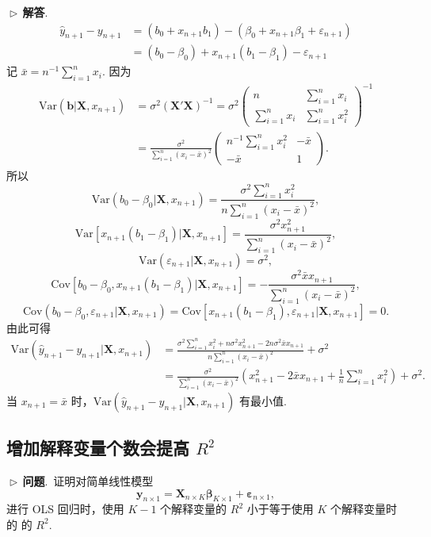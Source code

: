 \documentclass{article}
\newcommand{\Var}{\mathrm{Var}}
\newcommand{\Cov}{\mathrm{Cov}}
\newcommand{\y}{\mathbf{y}}
\newcommand{\X}{\mathbf{X}}
\newcommand{\0}{\mathbf{0}}
\newcommand{\vbe}{\bm{\beta}}
\newcommand{\vep}{\bm{\varepsilon}}
\newcommand{\vb}{\mathbf{b}}
\newcommand{\pro}{\noindent$\vartriangleright\,$\textbf{问题}.\ }
\newcommand{\sol}{\noindent$\vartriangleright\,$\textbf{解答}.\ }
\begin{document}
\sol
\begin{align*}
\hat{y}_{n+1}-y_{n+1}&=(b_0+x_{n+1}b_1)-(\beta_0+x_{n+1}\beta_1+\varepsilon_{n+1})\\
&=(b_0-\beta_0)+x_{n+1}(b_1-\beta_1)-\varepsilon_{n+1}
\end{align*}
记 $\bar{x}=n^{-1}\sum_{i=1}^{n}x_i$. 因为
\begin{align*}
\Var(\vb|\X,x_{n+1})&=\sigma^2(\X'\X)^{-1}=\sigma^2
\begin{pmatrix}
n& \sum\limits_{i=1}^{n}x_i\\
\sum\limits_{i=1}^{n}x_i& \sum\limits_{i=1}^{n}x_i^2
\end{pmatrix}^{-1}\\
&=\frac{\sigma^2}{\sum\limits_{i=1}^{n}(x_i-\bar{x})^2}
\begin{pmatrix}
n^{-1}\sum\limits_{i=1}^{n}x_i^2& -\bar{x}\\
 -\bar{x}& 1
\end{pmatrix}.
\end{align*}
所以
\[
\Var(b_0-\beta_0|\X,x_{n+1})=\frac{\sigma^2\sum\limits_{i=1}^{n}x_i^2}{n\sum\limits_{i=1}^{n}(x_i-\bar{x})^2},
\]
\[
\Var[x_{n+1}(b_1-\beta_1)|\X,x_{n+1}]=\frac{\sigma^2x_{n+1}^2}{\sum\limits_{i=1}^{n}(x_i-\bar{x})^2},
\]
\[
\Var(\varepsilon_{n+1}|\X,x_{n+1})=\sigma^2,
\]
\[
\Cov[b_0-\beta_0,x_{n+1}(b_1-\beta_1)|\X,x_{n+1}]=-\frac{\sigma^2\bar{x}x_{n+1}}{\sum\limits_{i=1}^{n}(x_i-\bar{x})^2},
\]
\[
\Cov(b_0-\beta_0,\varepsilon_{n+1}|\X,x_{n+1})=\Cov[x_{n+1}(b_1-\beta_1),\varepsilon_{n+1}|\X,x_{n+1}]=0.
\]
由此可得
\begin{align*}
\Var(\hat{y}_{n+1}-y_{n+1}|\X,x_{n+1})&=\frac{\sigma^2\sum\limits_{i=1}^{n}x_i^2+n\sigma^2x_{n+1}^2-2n\sigma^2\bar{x}x_{n+1}}{n\sum\limits_{i=1}^{n}(x_i-\bar{x})^2}+\sigma^2\\
&=\frac{\sigma^2}{\sum\limits_{i=1}^{n}(x_i-\bar{x})^2}\left(x_{n+1}^2-2\bar{x}x_{n+1}+\frac{1}{n}\sum\limits_{i=1}^{n}x_i^2\right)+\sigma^2.
\end{align*}
当 $x_{n+1}=\bar{x}$ 时，$\Var(\hat{y}_{n+1}-y_{n+1}|\X,x_{n+1})$ 有最小值.

\subsection{增加解释变量个数会提高 $R^2$}
\pro 证明对简单线性模型
\[
\y_{n\times1} = \X_{n\times K} \vbe_{K\times1} +\vep_{n\times1}, 
\]
进行 OLS 回归时，使用 $K-1$ 个解释变量的 $R^2$ 小于等于使用 $K$ 个解释变量时的 的 $R^2$.\\
\end{document}
